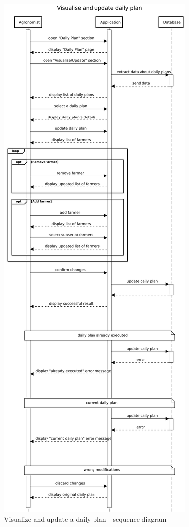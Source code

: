 \begin{figure}[H]
    \centering
    \includegraphics[scale=0.45]{Images/Sequence diagrams/Agronomist - visualise and update daily plan.pdf}

    \caption{Visualize and update a daily plan - sequence diagram}
    \label{fig:fig:seq_diag_update_daily_plan}
\end{figure}

